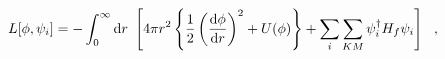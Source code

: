 \begin{equation}
L[\phi,\psi_i]=
	-\int_{0}^{\infty}{\rm d}r~
	\left[
	4\pi r^2\left\{
		\frac{1}{2}\left(\frac{{\rm d}\phi}{{\rm d}r}\right)^2
		+U(\phi)\right\}
	+\sum_i\sum_{KM}
	\psi_i^{\dagger}H_f\psi_i
	\right]~~,
\label{LL.eqn2}
\end{equation}

